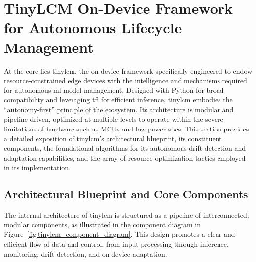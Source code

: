 \section{TinyLCM On-Device Framework for Autonomous Lifecycle Management}
\label{sec:tinylcm_detailed_design}

At the core lies \gls{tinylcm}, the on-device framework specifically engineered to endow resource-constrained edge devices with the intelligence and mechanisms required for autonomous \gls{ml} model management. Designed with Python for broad compatibility and leveraging \gls{tfl} for efficient inference, \gls{tinylcm} embodies the ``autonomy-first'' principle of the ecosystem. Its architecture is modular and pipeline-driven, optimized at multiple levels to operate within the severe limitations of hardware such as MCUs and low-power \glspl{sbc}. This section provides a detailed exposition of \gls{tinylcm}'s architectural blueprint, its constituent components, the foundational algorithms for its autonomous drift detection and adaptation capabilities, and the array of resource-optimization tactics employed in its implementation.

\subsection{Architectural Blueprint and Core Components}
\label{ssec:tinylcm_architecture_blueprint}

The internal architecture of \gls{tinylcm} is structured as a pipeline of interconnected, modular components, as illustrated in the component diagram in Figure~\ref{fig:tinylcm_component_diagram}. This design promotes a clear and efficient flow of data and control, from input processing through inference, monitoring, drift detection, and on-device adaptation.

